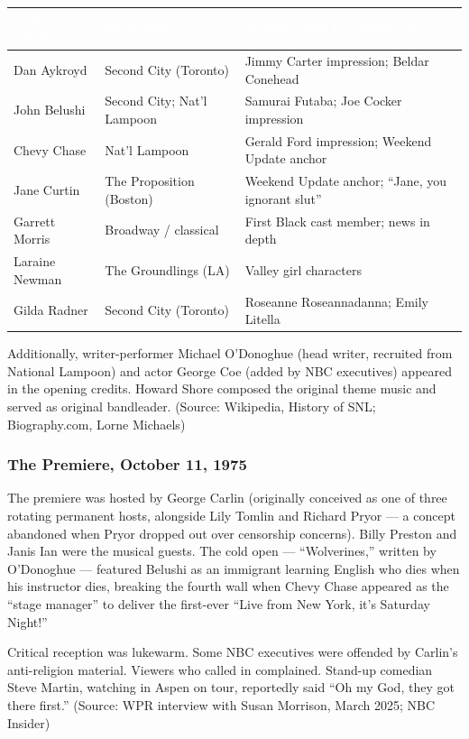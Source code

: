 \documentclass[11pt,letterpaper]{article}
\newcommand{\tableheader}[1]{\textbf{\sffamily\textcolor{white}{#1}}}
\begin{document}
\begin{center}
\begin{tabularx}{\textwidth}{L{3.5cm}XL{4cm}}
\toprule
{}
\tableheader{Cast Member} & \tableheader{Background} & \tableheader{Notable SNL Contribution} \\
\midrule
Dan Aykroyd & Second City (Toronto) & Jimmy Carter impression; Beldar Conehead \\
John Belushi & Second City; Nat'l Lampoon & Samurai Futaba; Joe Cocker impression \\
Chevy Chase & Nat'l Lampoon & Gerald Ford impression; Weekend Update anchor \\
Jane Curtin & The Proposition (Boston) & Weekend Update anchor; ``Jane, you ignorant slut'' \\
Garrett Morris & Broadway / classical & First Black cast member; news in depth \\
Laraine Newman & The Groundlings (LA) & Valley girl characters \\
Gilda Radner & Second City (Toronto) & Roseanne Roseannadanna; Emily Litella \\
\bottomrule
\end{tabularx}
\end{center}

Additionally, writer-performer Michael O'Donoghue (head writer, recruited from National Lampoon) and actor George Coe (added by NBC executives) appeared in the opening credits. Howard Shore composed the original theme music and served as original bandleader. (Source: Wikipedia, History of SNL; Biography.com, Lorne Michaels)

\subsubsection{The Premiere, October 11, 1975}

The premiere was hosted by George Carlin (originally conceived as one of three rotating permanent hosts, alongside Lily Tomlin and Richard Pryor --- a concept abandoned when Pryor dropped out over censorship concerns). Billy Preston and Janis Ian were the musical guests. The cold open --- ``Wolverines,'' written by O'Donoghue --- featured Belushi as an immigrant learning English who dies when his instructor dies, breaking the fourth wall when Chevy Chase appeared as the ``stage manager'' to deliver the first-ever ``Live from New York, it's Saturday Night!''

Critical reception was lukewarm. Some NBC executives were offended by Carlin's anti-religion material. Viewers who called in complained. Stand-up comedian Steve Martin, watching in Aspen on tour, reportedly said ``Oh my God, they got there first.'' (Source: WPR interview with Susan Morrison, March 2025; NBC Insider)
\end{document}

